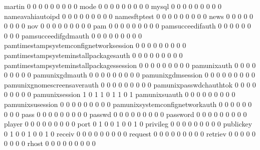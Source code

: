 \documentclass[compress,8pt]{beamer}
\begin{document}
\begin{frame}
\begin{Schunk}
  martin                                     0   0   0   0   0   0   0   0   0
  mode                                       0   0   0   0   0   0   0   0   0
  mysql                                      0   0   0   0   0   0   0   0   0
  nameavahiautoipd                           0   0   0   0   0   0   0   0   0
  namesftptest                               0   0   0   0   0   0   0   0   0
  news                                       0   0   0   0   0   0   0   0   0
  nov                                        0   0   0   0   0   0   0   0   0
  pam                                        0   0   0   0   0   0   0   0   0
  pamsucceedifauth                           0   0   0   0   0   0   0   0   0
  pamsucceedifgdmauth                        0   0   0   0   0   0   0   0   0
  pamtimestampsystemconfignetworksession     0   0   0   0   0   0   0   0   0
  pamtimestampsysteminstallpackagesauth      0   0   0   0   0   0   0   0   0
  pamtimestampsysteminstallpackagessession   0   0   0   0   0   0   0   0   0
  pamunixauth                                0   0   0   0   0   0   0   0   0
  pamunixgdmauth                             0   0   0   0   0   0   0   0   0
  pamunixgdmsession                          0   0   0   0   0   0   0   0   0
  pamunixgnomescreensaverauth                0   0   0   0   0   0   0   0   0
  pamunixpasswdchauthtok                     0   0   0   0   0   0   0   0   0
  pamunixsession                             1   0   1   1   0   1   1   0   1
  pamunixsuauth                              0   0   0   0   0   0   0   0   0
  pamunixsusession                           0   0   0   0   0   0   0   0   0
  pamunixsystemconfignetworkauth             0   0   0   0   0   0   0   0   0
  pass                                       0   0   0   0   0   0   0   0   0
  passwd                                     0   0   0   0   0   0   0   0   0
  password                                   0   0   0   0   0   0   0   0   0
  player                                     0   0   0   0   0   0   0   0   0
  port                                       0   1   0   0   1   0   0   1   0
  privileg                                   0   0   0   0   0   0   0   0   0
  publickey                                  0   1   0   0   1   0   0   1   0
  receiv                                     0   0   0   0   0   0   0   0   0
  request                                    0   0   0   0   0   0   0   0   0
  retriev                                    0   0   0   0   0   0   0   0   0
  rhost                                      0   0   0   0   0   0   0   0   0

\end{Schunk}
\end{frame}
\end{document}
